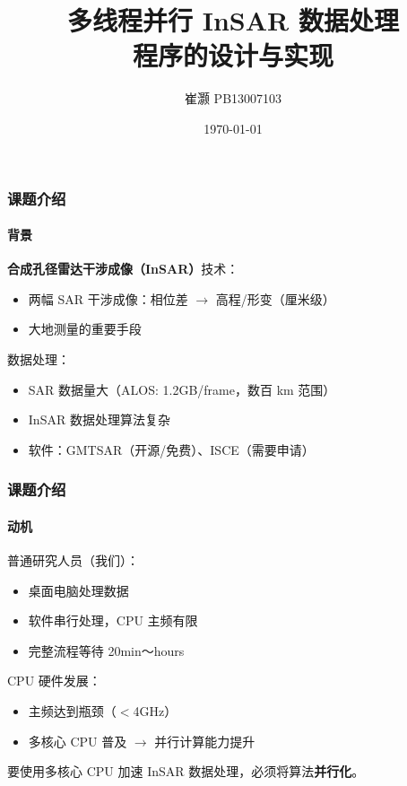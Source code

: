 \documentclass{beamer}
\title{多线程并行 InSAR 数据处理\\程序的设计与实现}
\author{崔灏 PB13007103}
\institute{中国科学技术大学\\地球和空间科学学院}
\date{\today}
\begin{document}
\frame{\titlepage}

\begin{frame}
    \frametitle{课题介绍}
    \framesubtitle{背景}

    \textbf{合成孔径雷达干涉成像（InSAR）}技术：
    \begin{itemize}
        \item 两幅 SAR 干涉成像：相位差 $\to$ 高程/形变（厘米级）
        \item 大地测量的重要手段
    \end{itemize}

    数据处理：
    \begin{itemize}
        \item SAR 数据量大（ALOS: 1.2GB/frame，数百 km 范围）
        \item InSAR 数据处理算法复杂
        \item 软件：GMTSAR（开源/免费）、ISCE（需要申请）
    \end{itemize}
\end{frame}


\begin{frame}
    \frametitle{课题介绍}
    \framesubtitle{动机}

    普通研究人员（我们）：
    \begin{itemize}
        \item 桌面电脑处理数据
        \item 软件串行处理，CPU 主频有限
        \item 完整流程等待 20min～hours
    \end{itemize}

    CPU 硬件发展：
    \begin{itemize}
        \item 主频达到瓶颈（$<$4GHz）
        \item 多核心 CPU 普及 $\to$ 并行计算能力提升
    \end{itemize}

    要使用多核心 CPU 加速 InSAR 数据处理，必须将算法\textbf{并行化}。
\end{frame}
\end{document}

